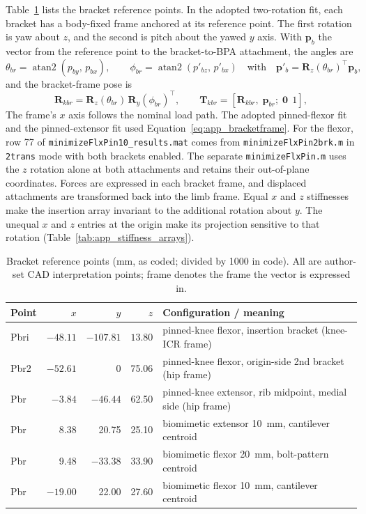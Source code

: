 Table~\ref{tab:app_bracket_points} lists the bracket reference points. In the adopted two-rotation fit, each bracket has a body-fixed frame anchored at its reference point. The first rotation is yaw about $z$, and the second is pitch about the yawed $y$ axis. With $\mathbf{p}_{b}$ the vector from the reference point to the bracket-to-BPA attachment, the angles are
\begin{equation}
    \theta_{br} = \operatorname{atan2}(p_{by},\, p_{bx}),
    \qquad
    \phi_{br} = \operatorname{atan2}(p'_{bz},\, p'_{bx})
    \quad\text{with}\quad
    \mathbf{p}'_{b} = \mathbf{R}_{z}(\theta_{br})^{\top}\mathbf{p}_{b},
    \label{eq:app_bracketangles}
\end{equation}
and the bracket-frame pose is
\begin{equation}
    \mathbf{R}_{kbr} = \mathbf{R}_{z}(\theta_{br})\,\mathbf{R}_{y}(\phi_{br})^{\top},
    \qquad
    \mathbf{T}_{kbr} = \left[\mathbf{R}_{kbr},\; \mathbf{p}_{br};\; \mathbf{0}\;\,1\right],
    \label{eq:app_bracketframe}
\end{equation}
The frame's $x$ axis follows the nominal load path. The adopted pinned-flexor fit and the pinned-extensor fit used Equation~\eqref{eq:app_bracketframe}. For the flexor, row 77 of \nolinkurl{minimizeFlxPin10_results.mat} comes from \nolinkurl{minimizeFlxPin2brk.m} in \texttt{2trans} mode with both brackets enabled. The separate \nolinkurl{minimizeFlxPin.m} uses the $z$ rotation alone at both attachments and retains their out-of-plane coordinates. Forces are expressed in each bracket frame, and displaced attachments are transformed back into the limb frame. Equal $x$ and $z$ stiffnesses make the insertion array invariant to the additional rotation about $y$. The unequal $x$ and $z$ entries at the origin make its projection sensitive to that rotation (Table~\ref{tab:app_stiffness_arrays}).

\begin{table}[htbp]
\caption{Bracket reference points (mm, as coded; divided by 1000 in code). All are author-set CAD interpretation points; frame denotes the frame the vector is expressed in.}
\label{tab:app_bracket_points}
\begin{tabularx}{\textwidth}{@{}lrrr>{\raggedright\arraybackslash}X@{}}
\toprule
\textbf{Point} & $x$ & $y$ & $z$ & \textbf{Configuration / meaning} \\
\midrule
Pbri & $-48.11$ & $-107.81$ & $13.80$ & pinned-knee flexor, insertion bracket (knee-ICR frame) \\
Pbr2 & $-52.61$ & 0 & 75.06 & pinned-knee flexor, origin-side 2nd bracket (hip frame) \\
Pbr  & $-3.84$  & $-46.44$ & 62.50 & pinned-knee extensor, rib midpoint, medial side (hip frame) \\
Pbr  & 8.38 & 20.75 & 25.10 & biomimetic extensor \qty{10}{\mm}, cantilever centroid \\
Pbr  & 9.48 & $-33.38$ & 33.90 & biomimetic flexor \qty{20}{\mm}, bolt-pattern centroid \\
Pbr  & $-19.00$ & 22.00 & 27.60 & biomimetic flexor \qty{10}{\mm}, cantilever centroid \\
\bottomrule
\end{tabularx}
\end{table}

